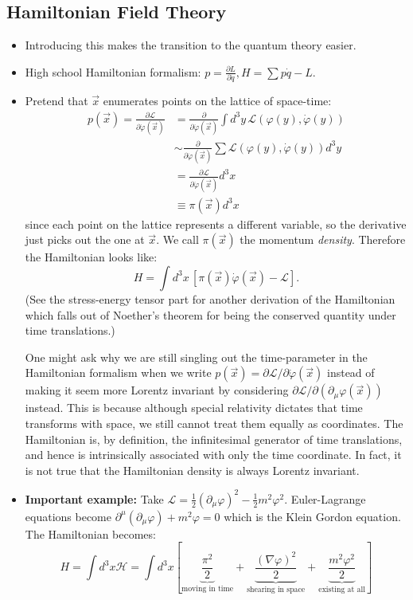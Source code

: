 \documentclass{report}
\theoremstyle{plain}
\theoremstyle{definition}
\theoremstyle{remark}
\newcommand{\FR}[2]{\frac{#1}{#2}}
\newcommand{\mc}{\mathcal}
\newcommand{\vphi}{\varphi}
\newcommand{\di}{\partial}
\newcommand{\ddi}[2]{\FR{\partial {#1}}{\partial {#2}}}
\begin{document}
\subsection{Hamiltonian Field Theory}
    \begin{itemize}
\item Introducing this makes the transition to the quantum theory easier.
\item High school Hamiltonian formalism: 
    $p = \ddi{L}{\dot q},H=\sum p\dot q-L$.
\item Pretend that $\vec x$ enumerates points on the lattice of space-time:
    \begin{align*}
        p(\vec x) = \ddi{\mc L}{\dot\vphi(\vec x)}
        &= \ddi{}{\dot\vphi(\vec x)}\int d^3y\, \mc
        L(\vphi(y),\dot\vphi(y))\\
        &\sim \ddi{}{\dot\vphi(\vec x)}\sum \mc
        L(\vphi(y),\dot\vphi(y)) d^3y\\
        &= \ddi{\mc L}{\dot\vphi(\vec x)} d^3x\\
        &\equiv \pi(\vec x)d^3 x
    \end{align*}
    since each point on the lattice represents a different variable, so the
    derivative just picks out the one at $\vec x$. We call $\pi(\vec x)$
    the momentum \emph{density}. Therefore the Hamiltonian looks like:
    \[H = \int d^3x\, \left[\pi(\vec x)\dot\vphi(\vec x) - \mc L\right].\]
    (See the stress-energy tensor part for another derivation of the
    Hamiltonian which falls out of Noether's theorem for being the
    conserved quantity under time translations.)
    
    One might ask why we are still singling out the time-parameter in
    the Hamiltonian formalism when we write $p(\vec{x}) = \partial \mc
    L/\partial \dot\vphi(\vec x)$ instead of making it seem more
    Lorentz invariant by considering $\partial \mc
    L/\partial(\partial_\mu \vphi(\vec x))$ instead. This is because
    although special relativity dictates that time transforms with
    space, we still cannot treat them equally as coordinates. The
    Hamiltonian is, by definition, the infinitesimal generator of time
    translations, and hence is intrinsically associated with only the
    time coordinate. In fact, it is not true that the Hamiltonian
    density is always Lorentz invariant.
    
\item \textbf{Important example:} Take $\mc L = \FR{1}{2}(\di_\mu\vphi)^2 -\FR{1}{2}
    m^2\vphi^2$. Euler-Lagrange equations become $\di^\mu(\di_\mu
    \vphi)+m^2\vphi=0$ which is the Klein Gordon equation. The Hamiltonian
    becomes:
    \[ H = \int d^3x \mc H
= \int d^3x \left[ \underbrace{\FR{\pi^2}{2}}_{\text{moving in time}}
    + \underbrace{\FR{(\nabla \vphi)^2}{2}}_{\text{shearing in space}}
+ \underbrace{\FR{m^2\vphi^2}{2}}_{\text{existing at all}}\right]\]
    \end{itemize}
    
\end{document}
